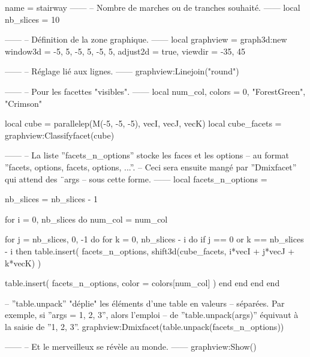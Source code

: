 \documentclass{standalone}
\begin{document}
\begin{luadraw}{name = stairway}
------
-- Nombre de marches ou de tranches souhaité.
------
local nb_slices = 10

------
-- Définition de la zone graphique.
------
local graphview = graph3d:new{
  window3d = {-5, 5, -5, 5, -5, 5},
  adjust2d = true,
  viewdir  = {-35, 45}
}

------
-- Réglage lié aux lignes.
------
graphview:Linejoin("round")

------
-- Pour les facettes "visibles".
------
local num_col, colors = 0, {"ForestGreen", "Crimson"}

local cube        = parallelep(M(-5, -5, -5), vecI, vecJ, vecK)
local cube_facets = graphview:Classifyfacet(cube)

------
-- La liste ''facets_n_options'' stocke les faces et les options
-- au format ''{facets, options, facets, options, ...}''.
-- Ceci sera ensuite mangé par ''Dmixfacet'' qui attend des ¨args
-- sous cette forme.
------
local facets_n_options = {}

nb_slices = nb_slices - 1

for i = 0, nb_slices do
  num_col = num_col%

  for j = nb_slices, 0, -1 do
    for k = 0, nb_slices - i do
      if j == 0 or k == nb_slices - i then
        table.insert(
          facets_n_options,
          shift3d(cube_facets, i*vecI + j*vecJ + k*vecK)
        )

        table.insert(
          facets_n_options,
          {
            color = colors[num_col]
          })
      end
    end
  end
end

-- ''table.unpack'' "déplie" les éléments d'une table en valeurs
-- séparées. Par exemple, si ''args = {1, 2, 3}'', alors l'emploi
-- de ''table.unpack(args)'' équivaut à la saisie de ''1, 2, 3''.
graphview:Dmixfacet(table.unpack(facets_n_options))

------
-- Et le merveilleux se révèle au monde.
------
graphview:Show()
\end{luadraw}
\end{document}
